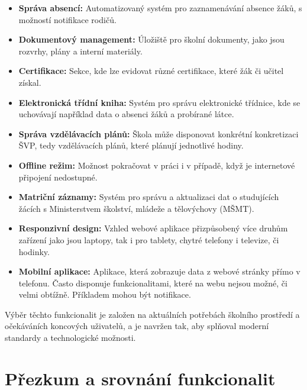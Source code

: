 \documentclass[FM,Proj]{tulthesis}
\begin{document}
\begin{itemize}
    \item \textbf{Správa absencí:} Automatizovaný systém pro zaznamenávání absence žáků, s možností notifikace rodičů.
    
    \item \textbf{Dokumentový management:} Úložiště pro školní dokumenty, jako jsou rozvrhy, plány a interní materiály.
    
    \item \textbf{Certifikace:} Sekce, kde lze evidovat různé certifikace, které žák či učitel získal.

    \item \textbf{Elektronická třídní kniha:} Systém pro správu elektronické třídnice, kde se uchovávají například data 
    o absenci žáků a probírané látce.

    \item \textbf{Správa vzdělávacích plánů:} Škola může disponovat konkrétní konkretizaci ŠVP, tedy vzdělávacích plánů,
    které plánují jednotlivé hodiny.
    
    \item \textbf{Offline režim:} Možnost pokračovat v práci i v případě, když je internetové připojení nedostupné.

    \item \textbf{Matriční záznamy:} Systém pro správu a aktualizaci dat o studujících žácích s Ministerstvem školství,
    mládeže a tělovýchovy (MŠMT).

    \item \textbf{Responzivní design:} Vzhled webové aplikace přizpůsobený více druhům zařízení jako jsou laptopy,
    tak i pro tablety, chytré telefony i televize, či hodinky.

    \item \textbf{Mobilní aplikace:} Aplikace, která zobrazuje data z webové stránky přímo v telefonu. Často
    disponuje funkcionalitami, které na webu nejsou možné, či velmi obtížně. Příkladem mohou být notifikace.

\end{itemize}

Výběr těchto funkcionalit je založen na aktuálních potřebách školního prostředí a očekáváních koncových uživatelů,
a je navržen tak, aby splňoval moderní standardy a technologické možnosti.

\section{Přezkum a srovnání funkcionalit}
\end{document}
